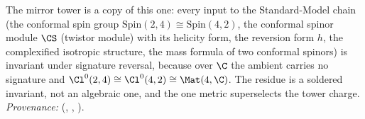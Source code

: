 The mirror tower is a copy of this one: every input to the Standard-Model chain (the conformal spin group $\mathrm{Spin}(2,4) \cong \mathrm{Spin}(4,2)$, the conformal spinor module $\CS$ (twistor module) with its helicity form, the reversion form $h$, the complexified isotropic structure, the mass formula of two conformal spinors) is invariant under signature reversal, because over $\C$ the ambient carries no signature and $\Cl^{0}(2,4) \cong \Cl^{0}(4,2) \cong \Mat(4,\C)$. The residue is a soldered invariant, not an algebraic one, and the one metric superselects the tower charge. \emph{Provenance:} \cite[Thms.~3.5 and 4.3, Prop.~4.1]{ButlerT14} (, , ).
